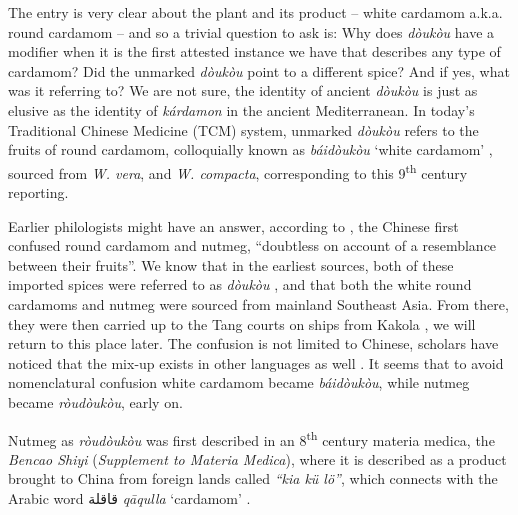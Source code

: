 \documentclass[12pt]{article}
\newcommand{\tc}[1]{\traditionalchinesefont{#1}\rmfamily}
\begin{document}

The entry is very clear about the plant and its product -- white cardamom a.k.a. round cardamom -- and so a trivial question to ask is: Why does \textit{dòukòu} have a modifier when it is the first attested instance we have that describes any type of cardamom? Did the unmarked \textit{dòukòu} point to a different spice? And if yes, what was it referring to? We are not sure, the identity of ancient \textit{dòukòu} is just as elusive as the identity of \textit{kárdamon} in the ancient Mediterranean. In today's Traditional Chinese Medicine (TCM) system, unmarked \textit{dòukòu} refers to the fruits of round cardamom, colloquially known as \textit{báidòukòu} `white cardamom' \parencites[cf.][]{polyu_2024_chinese,hkbu_2024_chinese}, sourced from \textit{W. vera}, and \textit{W. compacta}, corresponding to this 9\textsuperscript{th} century reporting.



Earlier philologists might have an answer, according to \textcite[22]{donkin_2003_east}, the Chinese first confused round cardamom and nutmeg, ``doubtless on account of a resemblance between their fruits''. We know that in the earliest sources, both of these imported spices were referred to as \textit{dòukòu} \parencites{hsu_1967_notes}{donkin_2003_east}, and that both the white round cardamoms and nutmeg were sourced from mainland Southeast Asia. From there, they were then carried up to the Tang courts on ships from Kakola \parencite[184-185]{schafer_1985_golden}, we will return to this place later. The confusion is not limited to Chinese, scholars have noticed that the mix-up exists in other languages as well \parencite[see][]{wolters_1967_early,wheatley_1961_golden}. It seems that to avoid nomenclatural confusion white cardamom became \tc{白豆蔻} \textit{báidòukòu}, while nutmeg became \tc{肉豆蔻} \textit{ròudòukòu}, early on.

Nutmeg as \tc{肉豆蔻} \textit{ròudòukòu} was first described in an 8\textsuperscript{th} century materia medica, the \tc{本草拾遺} \textit{Bencao Shiyi} (\textit{Supplement to Materia Medica}), where it is described as a product brought to China from foreign lands called \tc{迦拘勒} \textit{``kia kü lö''}, which \textcite[210]{hirth_1911_chau} connects with the Arabic word قاقلة \textit{qāqulla} `cardamom' \parencite[see also][19]{hoogervorst_2013_southeast}. 
\end{document}
